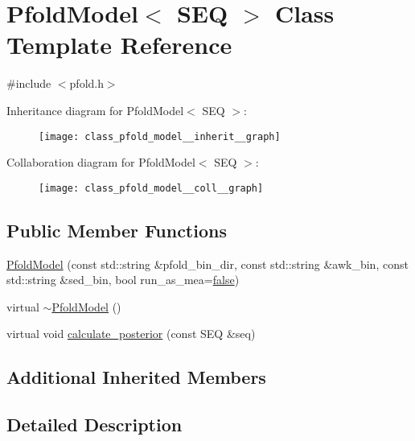 \hypertarget{class_pfold_model}{\section{Pfold\+Model$<$ S\+E\+Q $>$ Class Template Reference}
\label{class_pfold_model}
}


{\ttfamily \#include $<$pfold.\+h$>$}



Inheritance diagram for Pfold\+Model$<$ S\+E\+Q $>$\+:
\nopagebreak
\begin{figure}[H]
\begin{center}
\leavevmode
\texttt{[image: class\_pfold\_model\_\_inherit\_\_graph]}
\end{center}
\end{figure}


Collaboration diagram for Pfold\+Model$<$ S\+E\+Q $>$\+:
\nopagebreak
\begin{figure}[H]
\begin{center}
\leavevmode
\texttt{[image: class\_pfold\_model\_\_coll\_\_graph]}
\end{center}
\end{figure}
\subsection*{Public Member Functions}
\begin{DoxyCompactItemize}
\item 
\hyperlink{class_pfold_model_aaa99dc56b808fe0fbdb2ac21810f9c02}{Pfold\+Model} (const std\+::string \&pfold\+\_\+bin\+\_\+dir, const std\+::string \&awk\+\_\+bin, const std\+::string \&sed\+\_\+bin, bool run\+\_\+as\+\_\+mea=\hyperlink{naview_8c_a65e9886d74aaee76545e83dd09011727}{false})
\item 
virtual \hyperlink{class_pfold_model_a3aa6fa770f1f1f665807cf4504438f08}{$\sim$\+Pfold\+Model} ()
\item 
virtual void \hyperlink{class_pfold_model_a049dd223a8aae36e6e3b9d1c6e9c3b6f}{calculate\+\_\+posterior} (const S\+E\+Q \&seq)
\end{DoxyCompactItemize}
\subsection*{Additional Inherited Members}


\subsection{Detailed Description}

